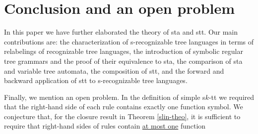 \documentclass[10pt]{scrartcl}
\begin{document}
\section{Conclusion and an open problem}


In this paper we have further elaborated the theory of sta and stt. Our main contributions are: the characterization of s-recognizable tree languages in terms of relabelings of recognizable tree languages, the introduction of symbolic regular tree grammars and the proof of their equivalence to sta, the comparison of sta and variable tree automata, the composition of stt, and the forward and backward application of stt to s-recognizable tree languages.

Finally, we  mention an open problem.
In the definition of simple s$k$-tt we required that the right-hand side of each rule contains exactly one function symbol. We conjecture that, for the closure result in Theorem \ref{slin-theo}, it is sufficient to require that right-hand sides of rules contain \underline{at most one} function 
\end{document}
